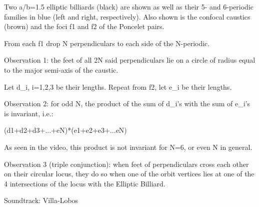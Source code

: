 Two a/b=1.5 elliptic billiards (black) are shown as well as their 5- and 6-periodic families in blue (left and right, respectively). Also shown is the confocal caustics (brown) and the foci f1 and f2 of the Poncelet pairs.

From each f1 drop N perpendiculars to each side of the N-periodic. 

Observation 1: the feet of all 2N said perpendiculars lie on a circle of radius equal to the major semi-axis of the caustic.

Let d_i, i=1,2,3 be their lengths. Repeat from f2, let e_i be their lengths.

Observation 2: for odd N, the product of the sum of d_i's with the sum of e_i's is invariant, i.e.:

(d1+d2+d3+...+eN)*(e1+e2+e3+...eN)

As seen in the video, this product is not invariant for N=6, or even N in general.

Observation 3 (triple conjunction): when feet of perpendiculars cross each other on their circular locus, they do so when one of the orbit vertices lies at one of the 4 intersections of the locus with the Elliptic Billiard.

Soundtrack: Villa-Lobos